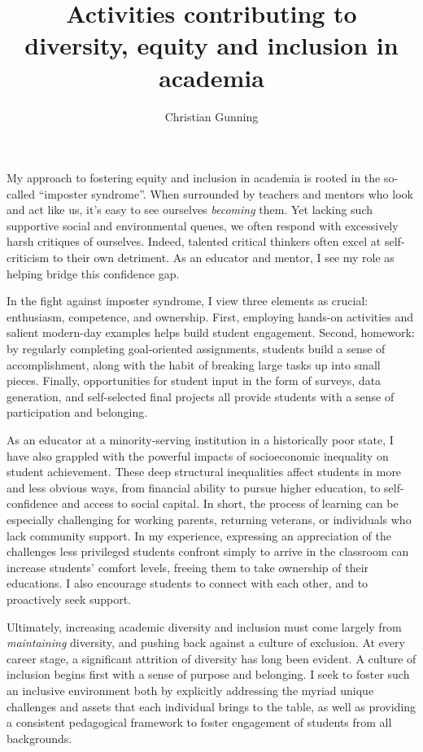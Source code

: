 \documentclass[12pt]{article}
\author{Christian Gunning}
\title{Activities contributing to\\diversity, equity and inclusion in academia}
\date{}
\begin{document}
\maketitle
\thispagestyle{empty}
\linespread{1.25}\selectfont

My approach to fostering equity and inclusion in academia 
is rooted in the so-called ``imposter syndrome''.  When surrounded by 
teachers and mentors who look and act like us, it's easy to 
see ourselves {\em becoming} them.  Yet lacking such supportive 
social and environmental queues, we often respond with excessively
harsh critiques of ourselves. Indeed, talented critical thinkers often 
excel at self-criticism to their own detriment.
As an educator and mentor, I see my role as helping
bridge this confidence gap.

In the fight against imposter syndrome, I view three 
elements as crucial: enthusiasm, competence, and ownership.
First, employing hands-on
activities and salient modern-day examples helps build student engagement.
Second, homework: by regularly completing goal-oriented assignments, 
students build a sense of accomplishment, along with the habit of 
breaking large tasks up into small pieces.  Finally, opportunities
for student input in the form of surveys, data generation, and 
self-selected final projects all provide students with a sense 
of participation and belonging. 

As an educator at a minority-serving institution in
a historically poor state, I have also grappled with the powerful
impacts of socioeconomic inequality on student achievement. 
These deep structural inequalities affect students in more 
and less obvious ways, from financial ability to pursue higher 
education, to self-confidence and access to social capital.
In short, the process of learning can be especially challenging
for working parents, returning veterans, or individuals who
lack community support. In my experience, expressing an 
appreciation of the challenges less privileged students confront
simply to arrive in the classroom can increase students'
comfort levels, freeing them to take ownership of their educations.
I also encourage students to connect with each other,
and to proactively seek support.

Ultimately, increasing academic diversity and inclusion must 
come largely from {\em maintaining} diversity, and pushing back
against a culture of exclusion. At every career stage, a
significant attrition of diversity has long been 
evident. A culture of inclusion begins first with a sense of 
purpose and belonging. I seek to foster such an inclusive 
environment both by explicitly addressing the myriad unique 
challenges and 
assets that each individual brings to the table, as well as 
providing a consistent pedagogical framework to foster 
engagement of students from all backgrounds. 
\end{document}
